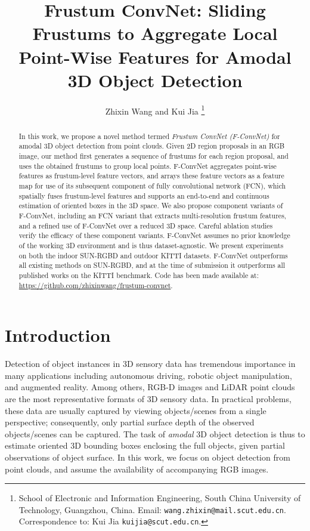 \documentclass[letterpaper, 10 pt, conference]{ieeeconf}
\title{\LARGE \bf
Frustum ConvNet: Sliding Frustums to Aggregate Local Point-Wise Features for Amodal 3D Object Detection
}
\author{Zhixin Wang  and Kui Jia  \thanks{School of Electronic and Information Engineering, South China University of Technology, Guangzhou, China.
		Email: {\tt\small wang.zhixin@mail.scut.edu.cn}.
		\newline Correspondence to: Kui Jia {\tt\small kuijia@scut.edu.cn}.}
}
\begin{document}
\maketitle
\thispagestyle{empty}
\pagestyle{empty}


\begin{abstract}
	In this work, we propose a novel method termed \emph{Frustum ConvNet (F-ConvNet)} for amodal 3D object detection from point clouds. Given 2D region proposals in an RGB image, our method first generates a sequence of frustums for each region proposal, and uses the obtained frustums to group local points. F-ConvNet aggregates point-wise features as frustum-level feature vectors, and arrays these feature vectors as a feature map for use of its subsequent component of fully convolutional network (FCN), which spatially fuses frustum-level features and supports an end-to-end and continuous estimation of oriented boxes in the 3D space. We also propose component variants of F-ConvNet, including an FCN variant that extracts multi-resolution frustum features, and a refined use of F-ConvNet over a reduced 3D space. Careful ablation studies verify the efficacy of these component variants. F-ConvNet assumes no prior knowledge of the working 3D environment and is thus dataset-agnostic. We present experiments on both the indoor SUN-RGBD and outdoor KITTI datasets. F-ConvNet outperforms all existing methods on SUN-RGBD, and at the time of submission it outperforms all published works on the KITTI benchmark. Code has been made available at: {\url{https://github.com/zhixinwang/frustum-convnet}.}
\end{abstract}



\section{Introduction}
\label{SecIntro}

Detection of object instances in 3D sensory data has tremendous importance in many applications including autonomous driving, robotic object manipulation, and augmented reality. Among others, RGB-D images and LiDAR point clouds are the most representative formats of 3D sensory data. In practical problems, these data are usually captured by viewing objects/scenes from a single perspective; consequently, only partial surface depth of the observed objects/scenes can be captured. The task of \emph{amodal} 3D object detection is thus to estimate oriented 3D bounding boxes enclosing the full objects, given partial observations of object surface. In this work, we focus on object detection from point clouds, and assume the availability of accompanying RGB images.
\end{document}

